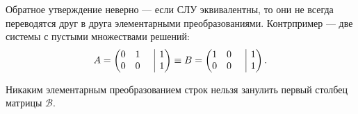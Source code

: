 \begin{remark}
    Обратное утверждение неверно --- если СЛУ эквивалентны, то они не всегда переводятся друг в друга элементарными преобразованиями. Контрпример --- две системы с пустыми множествами решений:
    $$
    A = 
    \begin{pmatrix}
        0 & 1 & \bord & 1\\
        0 & 0 & \bord & 1
    \end{pmatrix} \equiv
    B = 
    \begin{pmatrix}
        1 & 0 & \bord & 1\\
        0 & 0 & \bord & 1
    \end{pmatrix}.
    $$

    Никаким элементарным преобразованием строк нельзя занулить первый столбец матрицы $\mathcal{B}$.
\end{remark}

